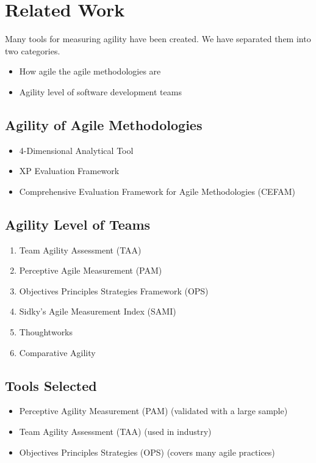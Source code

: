 \section{Related Work}

Many tools for measuring agility have been created. We have separated them into two categories. 

\begin{itemize}
	\item How agile the agile methodologies are
	\item Agility level of software development teams
\end{itemize}

\subsection{Agility of Agile Methodologies}

\begin{itemize}
	\item 4-Dimensional Analytical Tool
	\item XP Evaluation Framework
	\item Comprehensive Evaluation Framework for Agile Methodologies (CEFAM)
\end{itemize}

\subsection{Agility Level of Teams}

\begin{enumerate}
	\item Team Agility Assessment (TAA)
	\item Perceptive Agile Measurement (PAM)
	\item Objectives Principles Strategies Framework (OPS)
	\item Sidky's Agile Measurement Index (SAMI)
	\item Thoughtworks
	\item Comparative Agility
\end{enumerate}

\subsection{Tools Selected}

\begin{itemize}
	\item Perceptive Agility Measurement (PAM) \cite{pam} ({\footnotesize validated with a large sample})
	\item Team Agility Assessment (TAA) \cite{Leffingwell} ({\footnotesize used in industry})
	\item Objectives Principles Strategies (OPS) \cite{sventha_dissertation} ({\footnotesize covers many agile practices})
\end{itemize}


\clearpage

